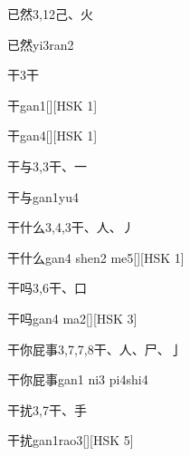 \begin{entry}{已然}{3,12}{⼰、⽕}
  \begin{phonetics}{已然}{yi3ran2}
  \end{phonetics}
\end{entry}

\begin{entry}{干}{3}{⼲}
  \begin{phonetics}{干}{gan1}[][HSK 1]
  \end{phonetics}
  \begin{phonetics}{干}{gan4}[][HSK 1]
  \end{phonetics}
\end{entry}

\begin{entry}{干与}{3,3}{⼲、⼀}
  \begin{phonetics}{干与}{gan1yu4}
  \end{phonetics}
\end{entry}

\begin{entry}{干什么}{3,4,3}{⼲、⼈、⼃}
  \begin{phonetics}{干什么}{gan4 shen2 me5}[][HSK 1]
  \end{phonetics}
\end{entry}

\begin{entry}{干吗}{3,6}{⼲、⼝}
  \begin{phonetics}{干吗}{gan4 ma2}[][HSK 3]
  \end{phonetics}
\end{entry}

\begin{entry}{干你屁事}{3,7,7,8}{⼲、⼈、⼫、⼅}
  \begin{phonetics}{干你屁事}{gan1 ni3 pi4shi4}
  \end{phonetics}
\end{entry}

\begin{entry}{干扰}{3,7}{⼲、⼿}
  \begin{phonetics}{干扰}{gan1rao3}[][HSK 5]
  \end{phonetics}
\end{entry}

